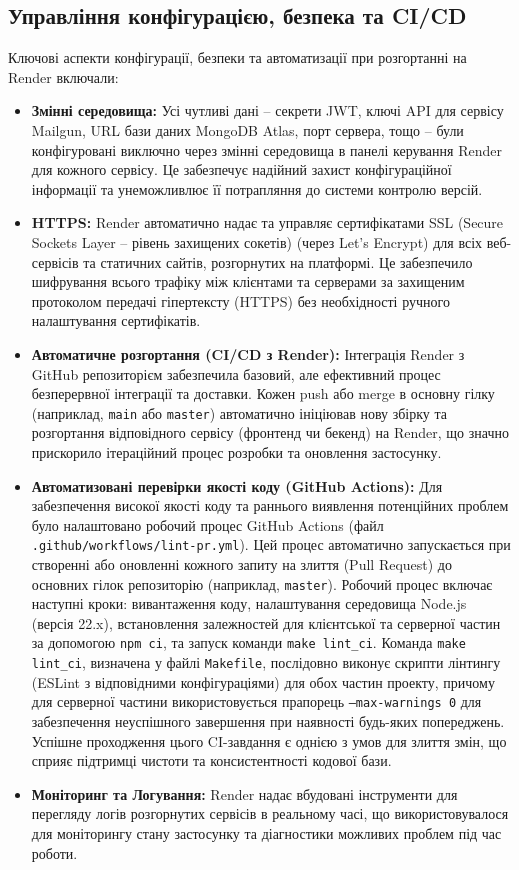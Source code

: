 \subsection{Управління конфігурацією, безпека та CI/CD}
Ключові аспекти конфігурації, безпеки та автоматизації при розгортанні на Render включали:
\begin{itemize}
    \item \textbf{Змінні середовища:} Усі чутливі дані – секрети JWT, ключі API для сервісу Mailgun, URL бази даних MongoDB Atlas, порт сервера, тощо – були конфігуровані виключно через змінні середовища в панелі керування Render для кожного сервісу. Це забезпечує надійний захист конфігураційної інформації та унеможливлює її потрапляння до системи контролю версій.
    \item \textbf{HTTPS:} Render автоматично надає та управляє сертифікатами SSL (Secure Sockets Layer – рівень захищених сокетів) (через Let's Encrypt) для всіх веб-сервісів та статичних сайтів, розгорнутих на платформі. Це забезпечило шифрування всього трафіку між клієнтами та серверами за захищеним протоколом передачі гіпертексту (HTTPS) без необхідності ручного налаштування сертифікатів.
    \item \textbf{Автоматичне розгортання (CI/CD з Render):} Інтеграція Render з GitHub репозиторієм забезпечила базовий, але ефективний процес безперервної інтеграції та доставки. Кожен push або merge в основну гілку (наприклад, \texttt{main} або \texttt{master}) автоматично ініціював нову збірку та розгортання відповідного сервісу (фронтенд чи бекенд) на Render, що значно прискорило ітераційний процес розробки та оновлення застосунку.
    \item \textbf{Автоматизовані перевірки якості коду (GitHub Actions):} Для забезпечення високої якості коду та раннього виявлення потенційних проблем було налаштовано робочий процес GitHub Actions (файл \texttt{.github/workflows/lint-pr.yml}). Цей процес автоматично запускається при створенні або оновленні кожного запиту на злиття (Pull Request) до основних гілок репозиторію (наприклад, \texttt{master}). Робочий процес включає наступні кроки: вивантаження коду, налаштування середовища Node.js (версія 22.x), встановлення залежностей для клієнтської та серверної частин за допомогою \texttt{npm ci}, та запуск команди \texttt{make lint\_ci}. Команда \texttt{make lint\_ci}, визначена у файлі \texttt{Makefile}, послідовно виконує скрипти лінтингу (ESLint з відповідними конфігураціями) для обох частин проекту, причому для серверної частини використовується прапорець \texttt{--max-warnings 0} для забезпечення неуспішного завершення при наявності будь-яких попереджень. Успішне проходження цього CI-завдання є однією з умов для злиття змін, що сприяє підтримці чистоти та консистентності кодової бази.
    \item \textbf{Моніторинг та Логування:} Render надає вбудовані інструменти для перегляду логів розгорнутих сервісів в реальному часі, що використовувалося для моніторингу стану застосунку та діагностики можливих проблем під час роботи.
\end{itemize}

